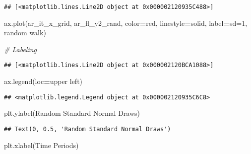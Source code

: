 \documentclass[
]{book}
\newenvironment{Shaded}{\begin{snugshade}}{\end{snugshade}}
\newcommand{\CommentTok}[1]{\textcolor[rgb]{0.56,0.35,0.01}{\textit{#1}}}
\newcommand{\NormalTok}[1]{#1}
\newcommand{\OperatorTok}[1]{\textcolor[rgb]{0.81,0.36,0.00}{\textbf{#1}}}
\newcommand{\StringTok}[1]{\textcolor[rgb]{0.31,0.60,0.02}{#1}}
\begin{document}
\begin{verbatim}
## [<matplotlib.lines.Line2D object at 0x000002120935C488>]
\end{verbatim}

\begin{Shaded}
\begin{Highlighting}[]
\NormalTok{ax.plot(ar\_it\_x\_grid, ar\_fl\_y2\_rand,}
\NormalTok{                     color}\OperatorTok{=}\StringTok{\textquotesingle{}red\textquotesingle{}}\NormalTok{, linestyle}\OperatorTok{=}\StringTok{\textquotesingle{}solid\textquotesingle{}}\NormalTok{,}
\NormalTok{                     label}\OperatorTok{=}\StringTok{\textquotesingle{}sd=1, random walk\textquotesingle{}}\NormalTok{)}
                     
\CommentTok{\# Labeling}
\end{Highlighting}
\end{Shaded}

\begin{verbatim}
## [<matplotlib.lines.Line2D object at 0x000002120BCA1088>]
\end{verbatim}

\begin{Shaded}
\begin{Highlighting}[]
\NormalTok{ax.legend(loc}\OperatorTok{=}\StringTok{\textquotesingle{}upper left\textquotesingle{}}\NormalTok{)}
\end{Highlighting}
\end{Shaded}

\begin{verbatim}
## <matplotlib.legend.Legend object at 0x000002120935C6C8>
\end{verbatim}

\begin{Shaded}
\begin{Highlighting}[]
\NormalTok{plt.ylabel(}\StringTok{\textquotesingle{}Random Standard Normal Draws\textquotesingle{}}\NormalTok{)}
\end{Highlighting}
\end{Shaded}

\begin{verbatim}
## Text(0, 0.5, 'Random Standard Normal Draws')
\end{verbatim}

\begin{Shaded}
\begin{Highlighting}[]
\NormalTok{plt.xlabel(}\StringTok{\textquotesingle{}Time Periods\textquotesingle{}}\NormalTok{)}
\end{Highlighting}
\end{Shaded}
\end{document}
